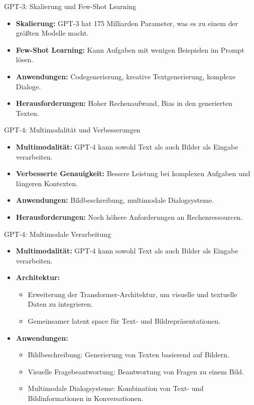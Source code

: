 \documentclass[aspectratio=1610, xcolor=dvipsnames, 9pt]{beamer}
\begin{document}
\begin{frame}{GPT-3: Skalierung und Few-Shot Learning}
  \begin{itemize}
    \item \textbf{Skalierung:} GPT-3 hat 175 Milliarden Parameter, was es zu einem der größten Modelle macht.
    \item \textbf{Few-Shot Learning:} Kann Aufgaben mit wenigen Beispielen im Prompt lösen.
    \item \textbf{Anwendungen:} Codegenerierung, kreative Textgenerierung, komplexe Dialoge.
    \item \textbf{Herausforderungen:} Hoher Rechenaufwand, Bias in den generierten Texten.
  \end{itemize}
\end{frame}

\begin{frame}{GPT-4: Multimodalität und Verbesserungen}
  \begin{itemize}
    \item \textbf{Multimodalität:} GPT-4 kann sowohl Text als auch Bilder als Eingabe verarbeiten.
    \item \textbf{Verbesserte Genauigkeit:} Bessere Leistung bei komplexen Aufgaben und längeren Kontexten.
    \item \textbf{Anwendungen:} Bildbeschreibung, multimodale Dialogsysteme.
    \item \textbf{Herausforderungen:} Noch höhere Anforderungen an Rechenressourcen.
  \end{itemize}
\end{frame}

\begin{frame}{GPT-4: Multimodale Verarbeitung}
  \begin{itemize}
    \item \textbf{Multimodalität:} GPT-4 kann sowohl Text als auch Bilder als Eingabe verarbeiten.
    \item \textbf{Architektur:}
      \begin{itemize}
        \item Erweiterung der Transformer-Architektur, um visuelle und textuelle Daten zu integrieren.
        \item Gemeinsamer latent space für Text- und Bildrepräsentationen.
      \end{itemize}
    \item \textbf{Anwendungen:}
      \begin{itemize}
        \item Bildbeschreibung: Generierung von Texten basierend auf Bildern.
        \item Visuelle Fragebeantwortung: Beantwortung von Fragen zu einem Bild.
        \item Multimodale Dialogsysteme: Kombination von Text- und Bildinformationen in Konversationen.
      \end{itemize}
  \end{itemize}
\end{frame}
\end{document}
